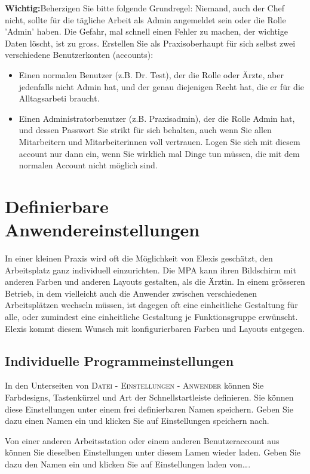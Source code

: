 \textbf{Wichtig:}Beherzigen Sie bitte folgende Grundregel: Niemand, auch der
Chef nicht, sollte für die tägliche Arbeit als
Admin angemeldet sein oder die Rolle 'Admin' haben. Die Gefahr, mal schnell einen Fehler zu machen, der
wichtige Daten löscht, ist zu gross. Erstellen Sie als Praxisoberhaupt für sich
selbst zwei verschiedene Benutzerkonten (accounts):
\begin{itemize}
  \item Einen normalen Benutzer (z.B. Dr. Test), der die Rolle oder
  Ärzte, aber jedenfalls nicht Admin hat, und der genau diejenigen Recht
   hat, die er für die Alltagsarbeti braucht.
  \item Einen Administratorbenutzer (z.B. Praxisadmin), der die Rolle Admin
  hat, und dessen Passwort Sie strikt für sich behalten, auch wenn Sie
  allen Mitarbeitern und Mitarbeiterinnen voll vertrauen. Logen Sie sich mit
  diesem account nur dann ein, wenn Sie wirklich mal Dinge tun müssen, die mit
  dem normalen Account nicht möglich sind.
\end{itemize}

\section{Definierbare Anwendereinstellungen}
In einer kleinen Praxis wird oft die Möglichkeit von Elexis geschätzt, den
Arbeitsplatz ganz individuell einzurichten. Die MPA kann ihren Bildschirm mit
anderen Farben und anderen Layouts gestalten, als die Ärztin.
In einem grösseren Betrieb, in dem vielleicht auch die Anwender zwischen
verschiedenen Arbeitsplätzen wechseln müssen, ist dagegen oft eine einheitliche
Gestaltung für alle, oder zumindest eine einheitliche Gestaltung je
Funktionsgruppe erwünscht. Elexis kommt diesem Wunsch mit konfigurierbaren
Farben und Layouts entgegen.

\subsection{Individuelle Programmeinstellungen}
In den Unterseiten von \textsc{Datei - Einstellungen - Anwender} können Sie
Farbdesigns, Tastenkürzel und Art der Schnellstartleiste definieren. Sie können
diese Einstellungen unter einem frei definierbaren Namen speichern. Geben Sie
dazu einen Namen ein und klicken Sie auf \glqq Einstellungen speichern
nach\grqq{}.

Von einer anderen Arbeitsstation oder einem anderen Benutzeraccount aus können
Sie dieselben Einstellungen unter diesem Lamen wieder laden. Geben Sie dazu den
Namen ein und klicken Sie auf \glqq Einstellungen laden von\ldots\grqq{}.

